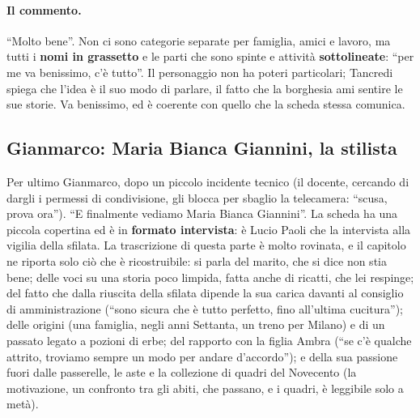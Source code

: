\paragraph{Il commento.} ``Molto bene''. Non ci sono categorie separate per
famiglia, amici e lavoro, ma tutti i \textbf{nomi in grassetto} e le parti che
sono spinte e attività \textbf{sottolineate}: ``per me va benissimo, c'è tutto''.
Il personaggio non ha poteri particolari; Tancredi spiega che l'idea è il suo modo
di parlare, il fatto che la borghesia ami sentire le sue storie. Va benissimo, ed è
coerente con quello che la scheda stessa comunica.

\subsection{Gianmarco: Maria Bianca Giannini, la stilista}

Per ultimo Gianmarco, dopo un piccolo incidente tecnico (il docente, cercando di
dargli i permessi di condivisione, gli blocca per sbaglio la telecamera: ``scusa,
prova ora''). ``E finalmente vediamo Maria Bianca Giannini''. La scheda ha una
piccola copertina ed è in \textbf{formato intervista}: è Lucio Paoli che la
intervista alla vigilia della sfilata. La trascrizione di questa parte è molto
rovinata, e il capitolo ne riporta solo ciò che è ricostruibile: si parla del
marito, che si dice non stia bene; delle voci su una storia poco limpida, fatta
anche di ricatti, che lei respinge; del fatto che dalla riuscita della sfilata
dipende la sua carica davanti al consiglio di amministrazione (``sono sicura che è
tutto perfetto, fino all'ultima cucitura''); delle origini (una famiglia, negli
anni Settanta, un treno per Milano) e di un passato legato a pozioni di erbe; del
rapporto con la figlia Ambra (``se c'è qualche attrito, troviamo sempre un modo
per andare d'accordo''); e della sua passione fuori dalle passerelle, le aste e la
collezione di quadri del Novecento (la motivazione, un confronto tra gli abiti,
che passano, e i quadri, è leggibile solo a metà).

